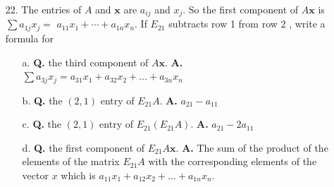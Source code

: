 \documentclass[main.tex]{subfiles}
\begin{document}
\begin{enumerate}
        \item [22.]  The entries of $A$ and $\bm{x}$ are $a_{i j}$ and $x_{j}$. So the first component of $A \bm{x}$ is $\sum a_{1 j} x_{j}=$ $a_{11} x_{1}+\cdots+a_{1 n} x_{n}$. If $E_{21}$ subtracts row 1 from row 2 , write a formula for
        \begin{enumerate}
            \item [a.] \textbf{Q.} the third component of $A \bm{x}$. 
            \textbf{A.} $\sum a_{3 j} x_{j}=a_{31} x_{1}+a_{32} x_{2}+\ldots+a_{3 n} x_{n}$
            
            \item [b.] \textbf{Q.} the $(2,1)$ entry of $E_{21} A$. 
            \textbf{A.} $a_{21}-a_{11}$
            
            \item [c.] \textbf{Q.} the $(2,1)$ entry of $E_{21}\left(E_{21} A\right)$. 
            \textbf{A.} $a_{21}-2 a_{11}$
            
            \item [d.] \textbf{Q.} the first component of $E_{21} A \bm{x}$. 
            \textbf{A.} The sum of the product of the elements of the matrix $E_{21} A$ with the corresponding elements of the vector $x$ which is 
            $a_{11} x_{1}+a_{12} x_{2}+\ldots+a_{1 n} x_{n}$.

        \end{enumerate}

    \end{enumerate}
\end{document}
